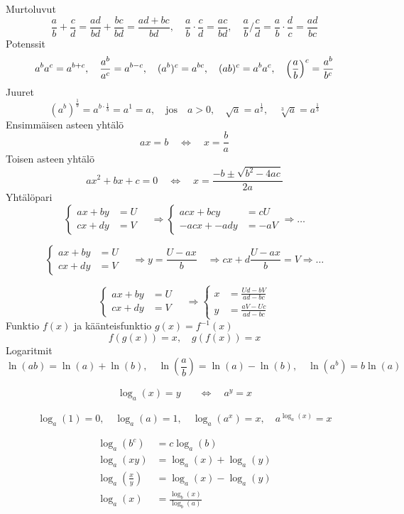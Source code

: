 \documentclass[12pt]{article}
\begin{document}
Murtoluvut
$$
\frac{a}{b}+\frac{c}{d}=\frac{ad}{bd}+\frac{bc}{bd}
=\frac{ad+bc}{bd},\quad 
\frac{a}{b}\cdot\frac{c}{d}=\frac{ac}{bd},\quad
\frac{a}{b}\bigg/\frac{c}{d}=\frac{a}{b}\cdot\frac{d}{c}=\frac{ad}{bc}
$$
Potenssit
$$
a^ba^c=a^{b+c},\quad 
\frac{a^b}{a^c}=a^{b-c},\quad 
(a^b)^c=a^{bc},\quad 
(ab)^c=a^ba^c,\quad 
\left(\frac{a}{b}\right)^c=\frac{a^b}{b^c}
$$
Juuret
$$
(a^b)^{\frac{1}{b}}=a^{b\cdot \frac{1}{b}}=a^1=a,\quad\textrm{jos}\quad a>0,\quad 
\sqrt{a}=a^{\frac{1}{2}},\quad \sqrt[3]{a}=a^{\frac{1}{3}}
$$
Ensimmäisen asteen yhtälö
$$
ax=b\quad\Leftrightarrow\quad x=\frac{b}{a}
$$
Toisen asteen yhtälö
$$
ax^2+bx+c=0\quad\Leftrightarrow\quad x=\frac{-b\pm\sqrt{b^2-4ac}}{2a}
$$
Yhtälöpari
$$
\begin{cases}
ax+by&=U\\
cx+dy&=V
\end{cases}\quad\Rightarrow
\begin{cases}
acx+bcy&=cU\\
-acx+-ady&=-aV
\end{cases}\Rightarrow\ldots
$$

$$
\begin{cases}
ax+by&=U\\
cx+dy&=V
\end{cases}\quad\Rightarrow
y=\frac{U-ax}{b}\quad\Rightarrow
cx+d\frac{U-ax}{b}=V\Rightarrow\ldots
$$

$$
\begin{cases}
ax+by&=U\\
cx+dy&=V
\end{cases}\quad\Rightarrow
\begin{cases}
x&=\frac{Ud-bV}{ad-bc}\\
y&=\frac{aV-Uc}{ad-bc}
\end{cases}
$$
Funktio $f(x)$ ja käänteisfunktio $g(x)=f^{-1}(x)$
$$
f(g(x))=x,\quad
g(f(x))=x
$$
Logaritmit
$$
\ln(ab)=\ln(a)+\ln(b),\quad
\ln(\frac{a}{b})=\ln(a)-\ln(b),\quad
\ln(a^b)=b\ln(a)
$$


\begin{equation*}
\begin{split}
\log_a(x)=y\quad&\Leftrightarrow\quad a^y=x
\end{split}
\end{equation*}


$$
\log_a(1)=0,\quad
\log_a(a)=1,\quad
\log_a(a^x)=x,\quad
a^{\log_a(x)}=x
$$

\begin{equation*}
\begin{split}
\log_a(b^c)&=c\log_a(b)\\
\log_a(xy)&=\log_a(x)+\log_a(y)\\
\log_a\left(\frac{x}{y}\right)
&=\log_a(x)-\log_a(y)\\
\log_a(x)&=\frac{\log_b(x)}{\log_b(a)}
\end{split}
\end{equation*}
\end{document}

